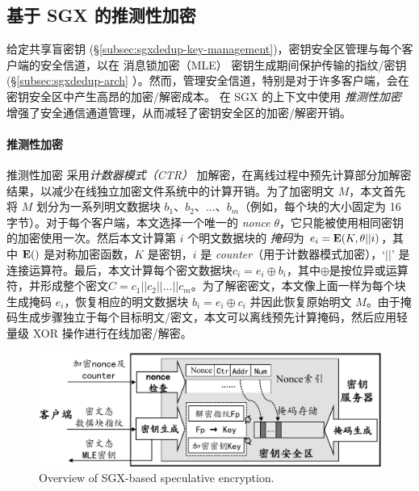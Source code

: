 \subsection{基于 SGX 的推测性加密}
\label{subsec:sgxdedup-encryption}

给定共享盲密钥 (\S\ref{subsec:sgxdedup-key-management})，密钥安全区管理与每个客户端的安全信道，以在 消息锁加密（MLE） 密钥生成期间保护传输的指纹/密钥 (\S\ref{subsec:sgxdedup-arch} ）。然而，管理安全信道，特别是对于许多客户端，会在密钥安全区中产生高昂的加密/解密成本。 \sysnameS 在 SGX 的上下文中使用 \textit{ 推测性加密} \cite{eduardo2019Speculative} 增强了安全通信通道管理，从而减轻了密钥安全区的加密/解密开销。

\paragraph*{推测性加密} 推测性加密 \cite{eduardo2019Speculative} 采用\textit{计数器模式（CTR）} \cite{counter} 加解密，在离线过程中预先计算部分加解密结果，以减少在线独立加密文件系统中的计算开销。为了加密明文 $M$，本文首先将 $M$ 划分为一系列明文数据块 $b_1、b_2、\ldots、b_m$（例如，每个块的大小固定为 16 字节）。对于每个客户端，本文选择一个唯一的 \textit{ nonce} $\theta$，它只能被使用相同密钥的加密使用一次。然后本文计算第 $i$ 个明文数据块的 \textit{掩码}为 $e_i = {\bf E}(K, \theta || i)$，其中 ${\bf E}()$ 是对称加密函数，$K$ 是密钥，$i$ 是 \textit{ counter}（用于计数器模式加密），`$||$' 是连接运算符。最后，本文计算每个密文数据块$c_i = e_i \oplus b_i $，其中$\oplus$是按位异或运算符，并形成整个密文$C = c_1 || c_2 || \ldots || c_m$。为了解密密文，本文像上面一样为每个块生成掩码 $e_i$，恢复相应的明文数据块 $b_i = e_i \oplus c_i$ 并因此恢复原始明文 $M$。由于掩码生成步骤独立于每个目标明文/密文，本文可以离线预先计算掩码，然后应用轻量级 XOR 操作进行在线加密/解密。

\begin{figure}[t]
\centering
\includegraphics[width=\textwidth]{pic/sgxdedup/key-enclave-arch.pdf}
\caption{Overview of SGX-based speculative encryption.}
\label{fig:sgxdedup-SpecEnc}
\end{figure}

